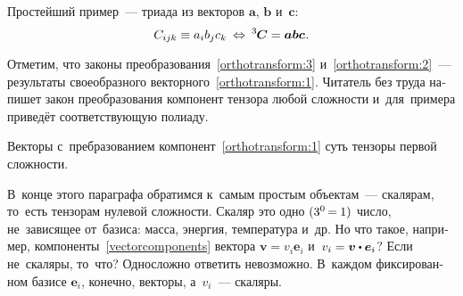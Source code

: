 \begin{otherlanguage}{russian}

Простейший пример~--- триада из векторов $\bm{a}$, $\bm{b}$ и~$\bm{c}$:
\[ C_{ijk} \equiv a_i b_j c_k \:\Leftrightarrow\: {^3\!\!\;\bm{C}} = \bm{a} \bm{b} \bm{c} \hspace{0.1ex}. \]

Отметим, что законы преобразования~\eqref{orthotransform:3} и~\eqref{orthotransform:2}~--- результаты своеобразного  векторного~\eqref{orthotransform:1}. Читатель без труда напишет закон преобразования компонент тензора любой сложности и~для~примера приведёт соответствующую полиаду.

Векторы с~пребразованием компонент~\eqref{orthotransform:1} суть тензоры первой сложности.

В~конце этого параграфа обратимся к~самым простым объектам~--- скалярам, то~есть тензорам нулевой сложности. Скаляр это одно ${(3^0 \hspace{-0.24ex}=\hspace{-0.12ex} 1)}$ число, не~зависящее от~базиса: масса, энергия, температура и~др. Но что такое, например, компоненты~\eqref{vectorcomponents} вектора ${\bm{v} = v_i \bm{e}_i}$ и~${v_i = \bm{v} \dotp \bm{e}_i}$? Если не~скаляры, то~что? Односложно ответить невозможно. В~каждом фиксированном базисе ${\bm{e}_i}$, конечно, векторы, а~${v_i}$~--- скаляры.

\end{otherlanguage}



\label{para:tensoractions}




